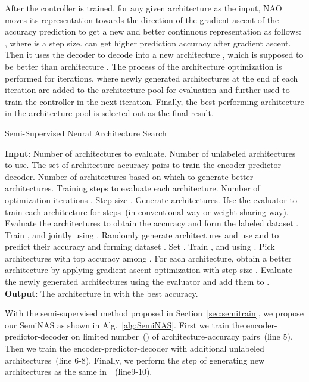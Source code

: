 \documentclass{article}
\begin{document}
After the controller is trained, for any given architecture  as the input, NAO moves its representation  towards the direction of the gradient ascent of the accuracy prediction  to get a new and better continuous representation  as follows: , where  is a step size.  can get higher prediction accuracy  after gradient ascent. Then it uses the decoder  to decode  into a new architecture , which is supposed to be better than architecture . The process of the architecture optimization is performed for  iterations, where newly generated architectures at the end of each iteration are added to the architecture pool for evaluation and further used to train the controller in the next iteration. Finally, the best performing architecture in the architecture pool is selected out as the final result. 

\begin{algorithm}[ht]
\caption{Semi-Supervised Neural Architecture Search}
\small
\label{alg:SemiNAS}
\begin{algorithmic}[1]
\STATE \textbf{Input}: Number of architectures  to evaluate. Number of unlabeled architectures  to use. The set of architecture-accuracy pairs  to train the encoder-predictor-decoder. Number of architectures  based on which to generate better architectures. Training steps  to evaluate each architecture. Number of optimization iterations . Step size .
\STATE Generate  architectures. Use the evaluator to train each architecture for  steps~(in conventional way or weight sharing way). 
\STATE Evaluate the  architectures to obtain the accuracy and form the labeled dataset .
\FOR {}
\STATE Train ,  and  jointly using .
\STATE Randomly generate  architectures and use  and  to predict their accuracy and forming dataset .
\STATE Set .
\STATE Train ,  and  using .
\STATE Pick  architectures with top accuracy among . For each architecture, obtain a better architecture by applying gradient ascent optimization with step size .
\STATE Evaluate the newly generated architectures using the evaluator and add them to .
\ENDFOR
\STATE \textbf{Output}: The architecture in  with the best accuracy.
\end{algorithmic}
\end{algorithm}

With the semi-supervised method proposed in Section~\ref{sec:semitrain}, we propose our SemiNAS as shown in Alg.~\ref{alg:SemiNAS}. First we train the encoder-predictor-decoder on limited number~() of architecture-accuracy pairs~(line 5). Then we train the encoder-predictor-decoder with additional  unlabeled architectures~(line 6-8). Finally, we perform the step of generating new architectures as the same in~\cite{nao}~(line9-10).
\end{document}
